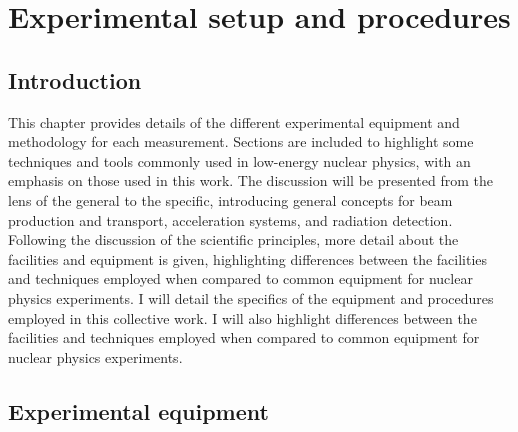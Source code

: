%
%
%
%
%
%
%
%
%
%

%
%

\chapter{Experimental setup and procedures}
\label{chap: experiment}

\section{Introduction}

This chapter provides details of the different experimental equipment and methodology for each measurement. Sections are included to highlight some techniques and tools commonly used in low-energy nuclear physics, with an emphasis on those used in this work. The discussion will be presented from the lens of the general to the specific, introducing general concepts for beam production and transport, acceleration systems, and radiation detection. Following the discussion of the scientific principles, more detail about the facilities and equipment is given, highlighting differences between the facilities and techniques employed when compared to common equipment for nuclear physics experiments. I will detail the specifics of the equipment and procedures employed in this collective work. I will also highlight differences between the facilities and techniques employed when compared to common equipment for nuclear physics experiments.



\section{Experimental equipment}
\label{sec: equipment}



